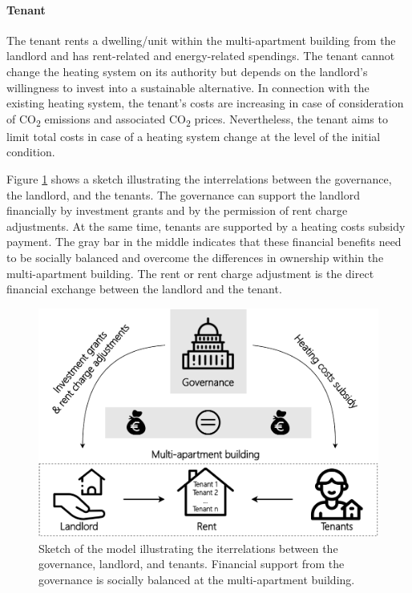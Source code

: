 \paragraph{Tenant} The tenant rents a dwelling/unit within the multi-apartment building from the landlord and has rent-related and energy-related spendings. The tenant cannot change the heating system on its authority but depends on the landlord's willingness to invest into a sustainable alternative. In connection with the existing heating system, the tenant's costs are increasing in case of consideration of CO\textsubscript{2} emissions and associated CO\textsubscript{2} prices. Nevertheless, the tenant aims to limit total costs in case of a heating system change at the level of the initial condition.\vspace{0.5cm}

Figure \ref{fig:methodology} shows a sketch illustrating the interrelations between the governance, the landlord, and the tenants. The governance can support the landlord financially by investment grants and by the permission of rent charge adjustments. At the same time, tenants are supported by a heating costs subsidy payment. The gray bar in the middle indicates that these financial benefits need to be socially balanced and overcome the differences in ownership within the multi-apartment building. The rent or rent charge adjustment is the direct financial exchange between the landlord and the tenant.\vspace{0.5cm}

\begin{figure}[h]
	\centering
	\includegraphics[width=0.7\linewidth]{figures/3_Methodology/Sketch.pdf}
	\caption{Sketch of the model illustrating the iterrelations between the governance, landlord, and tenants. Financial support from the governance is socially balanced at the multi-apartment building.}
	\label{fig:methodology}
\end{figure}

